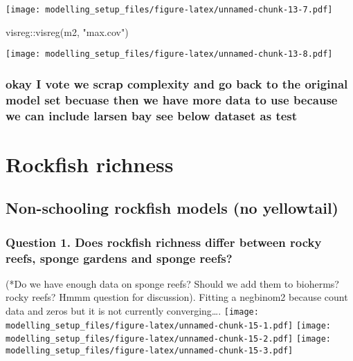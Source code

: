 \documentclass[
]{article}
\newenvironment{Shaded}{\begin{snugshade}}{\end{snugshade}}
\newcommand{\FunctionTok}[1]{\textcolor[rgb]{0.00,0.00,0.00}{#1}}
\newcommand{\NormalTok}[1]{#1}
\newcommand{\SpecialCharTok}[1]{\textcolor[rgb]{0.00,0.00,0.00}{#1}}
\newcommand{\StringTok}[1]{\textcolor[rgb]{0.31,0.60,0.02}{#1}}
\begin{document}
\texttt{[image: modelling\_setup\_files/figure-latex/unnamed-chunk-13-7.pdf]}

\begin{Shaded}
\begin{Highlighting}[]
\NormalTok{visreg}\SpecialCharTok{::}\FunctionTok{visreg}\NormalTok{(m2, }\StringTok{"max.cov"}\NormalTok{)}
\end{Highlighting}
\end{Shaded}

\texttt{[image: modelling\_setup\_files/figure-latex/unnamed-chunk-13-8.pdf]}

\hypertarget{okay-i-vote-we-scrap-complexity-and-go-back-to-the-original-model-set-becuase-then-we-have-more-data-to-use-because-we-can-include-larsen-bay-see-below-dataset-as-test}{%
\subsubsection{okay I vote we scrap complexity and go back to the
original model set becuase then we have more data to use because we can
include larsen bay see below dataset as
test}\label{okay-i-vote-we-scrap-complexity-and-go-back-to-the-original-model-set-becuase-then-we-have-more-data-to-use-because-we-can-include-larsen-bay-see-below-dataset-as-test}}

\hypertarget{rockfish-richness}{%
\section{Rockfish richness}\label{rockfish-richness}}

\hypertarget{non-schooling-rockfish-models-no-yellowtail-1}{%
\subsection{Non-schooling rockfish models (no
yellowtail)}\label{non-schooling-rockfish-models-no-yellowtail-1}}

\hypertarget{question-1.-does-rockfish-richness-differ-between-rocky-reefs-sponge-gardens-and-sponge-reefs}{%
\subsubsection{Question 1. Does rockfish richness differ between rocky
reefs, sponge gardens and sponge
reefs?}\label{question-1.-does-rockfish-richness-differ-between-rocky-reefs-sponge-gardens-and-sponge-reefs}}

(*Do we have enough data on sponge reefs? Should we add them to
bioherms? rocky reefs? Hmmm question for discussion). Fitting a
negbinom2 because count data and zeros but it is not currently
converging\ldots.
\texttt{[image: modelling\_setup\_files/figure-latex/unnamed-chunk-15-1.pdf]}
\texttt{[image: modelling\_setup\_files/figure-latex/unnamed-chunk-15-2.pdf]}
\texttt{[image: modelling\_setup\_files/figure-latex/unnamed-chunk-15-3.pdf]}
\end{document}
